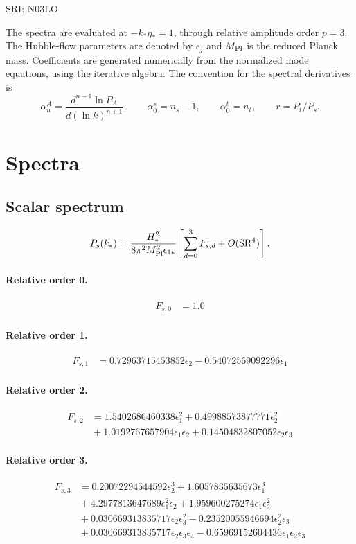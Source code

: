 \documentclass[10pt]{article}
\begin{document}
\begin{center}\Large SRI: N03LO\end{center}
The spectra are evaluated at $-k_*\eta_*=1$, through relative amplitude
order $p=3$. The Hubble-flow parameters are denoted by $\epsilon_j$
and $M_{\rm Pl}$ is the reduced Planck mass. Coefficients are generated
numerically from the normalized mode equations, using the iterative algebra.
The convention for the spectral derivatives is
\[
\alpha_n^A=\frac{d^{n+1}\ln P_A}{d(\ln k)^{n+1}},\qquad
\alpha_0^s=n_s-1,\qquad\alpha_0^t=n_t,\qquad r=P_t/P_s.
\]
\section{Spectra}

\subsection{Scalar spectrum}
\[P_s(k_*)=\frac{H_*^2}{8\pi^2M_{\rm Pl}^2\epsilon_{1*}}\left[\sum_{d=0}^{3}F_{s,d}+O(\mathrm{SR}^{4})\right].\]
\paragraph{Relative order 0.}
\begin{align*}
F_{s,0} &= 1.0
\end{align*}

\paragraph{Relative order 1.}
\begin{align*}
F_{s,1} &= 0.72963715453852 \epsilon_{2} - 0.54072569092296 \epsilon_{1}
\end{align*}

\paragraph{Relative order 2.}
\begin{align*}
F_{s,2} &= 1.5402686460338 \epsilon_{1}^{2} + 0.49988573877771 \epsilon_{2}^{2} \\
&{}  + 1.0192767657904 \epsilon_{1} \epsilon_{2} + 0.14504832807052 \epsilon_{2} \epsilon_{3}
\end{align*}

\paragraph{Relative order 3.}
\begin{align*}
F_{s,3} &= 0.20072294544592 \epsilon_{2}^{3} + 1.6057835635673 \epsilon_{1}^{3} \\
&{}  + 4.2977813647689 \epsilon_{1}^{2} \epsilon_{2} + 1.959600275274 \epsilon_{1} \epsilon_{2}^{2} \\
&{}  + 0.030669313835717 \epsilon_{2} \epsilon_{3}^{2} - 0.23520055946694 \epsilon_{2}^{2} \epsilon_{3} \\
&{}  + 0.030669313835717 \epsilon_{2} \epsilon_{3} \epsilon_{4} - 0.65969152604436 \epsilon_{1} \epsilon_{2} \epsilon_{3}
\end{align*}
\end{document}
